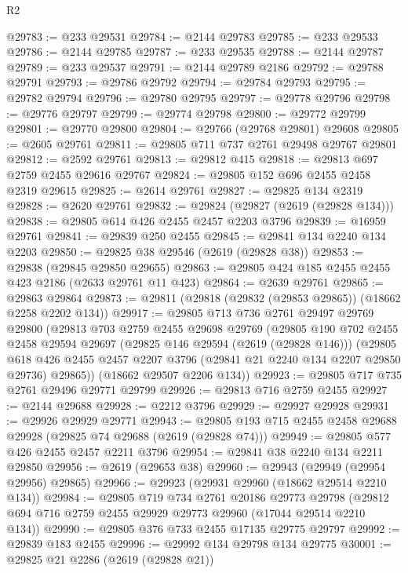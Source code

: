 \begin{lexlean}{R2}
\begin{coremodule}
@29783 := @233 @29531
@29784 := @2144 @29783
@29785 := @233 @29533
@29786 := @2144 @29785
@29787 := @233 @29535
@29788 := @2144 @29787
@29789 := @233 @29537
@29791 := @2144 @29789 @2186
@29792 := @29788 @29791
@29793 := @29786 @29792
@29794 := @29784 @29793
@29795 := @29782 @29794
@29796 := @29780 @29795
@29797 := @29778 @29796
@29798 := @29776 @29797
@29799 := @29774 @29798
@29800 := @29772 @29799
@29801 := @29770 @29800
@29804 := @29766 (@29768 @29801) @29608
@29805 := @2605 @29761
@29811 := @29805 @711 @737 @2761 @29498 @29767 @29801
@29812 := @2592 @29761
@29813 := @29812 @415
@29818 := @29813 @697 @2759 @2455 @29616 @29767
@29824 := @29805 @152 @696 @2455 @2458 @2319 @29615
@29825 := @2614 @29761
@29827 := @29825 @134 @2319
@29828 := @2620 @29761
@29832 := @29824 (@29827 (@2619 (@29828 @134)))
@29838 := @29805 @614 @426 @2455 @2457 @2203 @3796
@29839 := @16959 @29761
@29841 := @29839 @250 @2455
@29845 := @29841 @134 @2240 @134 @2203
@29850 := @29825 @38 @29546 (@2619 (@29828 @38))
@29853 := @29838 (@29845 @29850 @29655)
@29863 := @29805 @424 @185 @2455 @2455 @423 @2186 (@2633 @29761 @11 @423)
@29864 := @2639 @29761
@29865 := @29863 @29864
@29873 := @29811 (@29818 (@29832 (@29853 @29865)) (@18662 @2258 @2202 @134))
@29917 := @29805
    @713
    @736
    @2761
    @29497
    @29769
    @29800
    (@29813
      @703
      @2759
      @2455
      @29698
      @29769
      (@29805
        @190
        @702
        @2455
        @2458
        @29594
        @29697
        (@29825 @146 @29594 (@2619 (@29828 @146)))
        (@29805
          @618
          @426
          @2455
          @2457
          @2207
          @3796
          (@29841 @21 @2240 @134 @2207 @29850 @29736)
          @29865))
      (@18662 @29507 @2206 @134))
@29923 := @29805 @717 @735 @2761 @29496 @29771 @29799
@29926 := @29813 @716 @2759 @2455
@29927 := @2144 @29688
@29928 := @2212 @3796
@29929 := @29927 @29928
@29931 := @29926 @29929 @29771
@29943 := @29805 @193 @715 @2455 @2458 @29688 @29928 (@29825 @74 @29688 (@2619 (@29828 @74)))
@29949 := @29805 @577 @426 @2455 @2457 @2211 @3796
@29954 := @29841 @38 @2240 @134 @2211 @29850
@29956 := @2619 (@29653 @38)
@29960 := @29943 (@29949 (@29954 @29956) @29865)
@29966 := @29923 (@29931 @29960 (@18662 @29514 @2210 @134))
@29984 := @29805
    @719
    @734
    @2761
    @20186
    @29773
    @29798
    (@29812 @694 @716 @2759 @2455 @29929 @29773 @29960 (@17044 @29514 @2210 @134))
@29990 := @29805 @376 @733 @2455 @17135 @29775 @29797
@29992 := @29839 @183 @2455
@29996 := @29992 @134 @29798 @134 @29775
@30001 := @29825 @21 @2286 (@2619 (@29828 @21))

\end{coremodule}
\end{lexlean}
